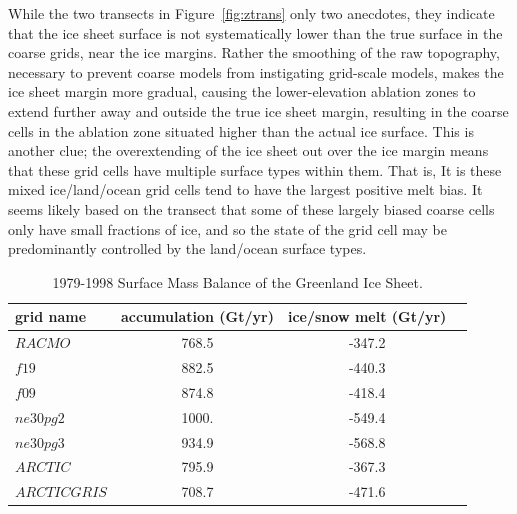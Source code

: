 \documentclass[draft]{agujournal2019}
\begin{document}
While the two transects in Figure~\ref{fig:ztrans} only two anecdotes, they indicate that the ice sheet surface is not systematically lower than the true surface in the coarse grids, near the ice margins. Rather the smoothing of the raw topography, necessary to prevent coarse models from instigating grid-scale models, makes the ice sheet margin more gradual, causing the lower-elevation ablation zones to extend further away and outside the true ice sheet margin, resulting in the coarse cells in the ablation zone situated higher than the actual ice surface. This is another clue; the overextending of the ice sheet out over the ice margin means that these grid cells have multiple surface types within them. That is, It is these mixed ice/land/ocean grid cells tend to have the largest positive melt bias. It seems likely based on the transect that some of these largely biased coarse cells only have small fractions of ice, and so the state of the grid cell may be predominantly controlled by the land/ocean surface types.

 \begin{table}
 \centering
 \scriptsize
 \begin{tabular}{lccc}
   \hline
   grid name & accumulation (Gt/yr) & ice/snow melt (Gt/yr) \\ 
   \hline
   $RACMO$ & 768.5 & -347.2 \\
   \hline
   $f19$ & 882.5 & -440.3 \\
   $f09$ & 874.8 & -418.4 \\
   $ne30pg2$ & 1000. & -549.4 \\
   $ne30pg3$ & 934.9 & -568.8 \\
   $ARCTIC$ & 795.9 & -367.3 \\
   $ARCTICGRIS$ & 708.7 & -471.6 \\
 \hline
 \end{tabular}
  \caption{1979-1998 Surface Mass Balance of the Greenland Ice Sheet.}
 \label{tbl:table3}
 \end{table}
\end{document}
